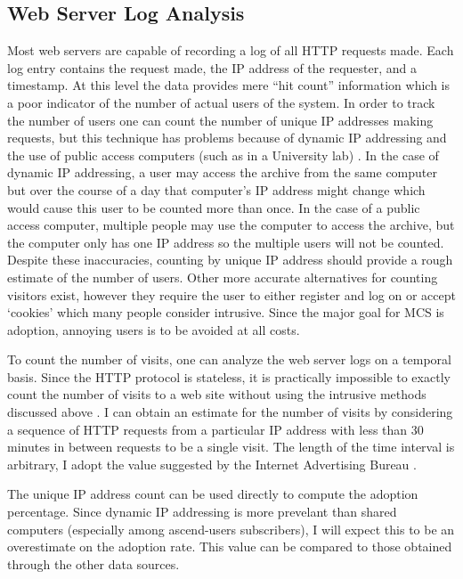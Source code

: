 \subsection{Web Server Log Analysis}
Most web servers are capable of recording a log of all HTTP \cite{rfc-http}
requests made. Each log entry contains the request made, the IP address of the
requester, and a timestamp. At this level the data provides mere ``hit count''
information which is a poor indicator of the number of actual users of the
system. In order to track the number of users one can count the number of
unique IP addresses making requests, but this technique has problems because of
dynamic IP addressing and the use of public access computers (such as in a
University lab) \cite{webmonkey-ebusiness1}. In the case of dynamic IP
addressing, a user may access the archive from the same computer but over the
course of a day that computer's IP address might change which would cause this
user to be counted more than once. In the case of a public access computer,
multiple people may use the computer to access the archive, but the computer
only has one IP address so the multiple users will not be counted. Despite
these inaccuracies, counting by unique IP address should provide a rough
estimate of the number of users. Other more accurate alternatives for counting
visitors exist, however they require the user to either register and log on or
accept `cookies' which many people consider intrusive.  Since the major goal
for MCS is adoption, annoying users is to be avoided at all costs.

To count the number of visits, one can analyze the web server logs on a
temporal basis. Since the HTTP protocol is stateless, it is practically
impossible to exactly count the number of visits to a web site without using
the intrusive methods discussed above \cite{webmonkey-ebusiness2}. I can
obtain an estimate for the number of visits by considering a sequence of HTTP
requests from a particular IP address with less than 30 minutes in between
requests to be a single visit. The length of the time interval is arbitrary, I
adopt the value suggested by the Internet Advertising Bureau
\cite{iab-metrics}.

The unique IP address count can be used directly to compute the adoption
percentage. Since dynamic IP addressing is more prevelant than shared computers
(especially among ascend-users subscribers), I will expect this to be an
overestimate on the adoption rate. This value can be compared to those obtained
through the other data sources.


